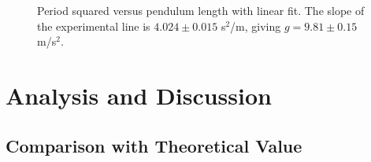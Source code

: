 \documentclass[11pt,a4paper]{article}
\begin{document}
\begin{figure}[htbp]
\centering


\caption{Period squared versus pendulum length with linear fit. The slope of the experimental line is $4.024 \pm 0.015$ s$^2$/m, giving $g = 9.81 \pm 0.15$ m/s$^2$.}
\label{fig:period-length}
\end{figure}

\section{Analysis and Discussion}
\label{sec:analysis}

\subsection{Comparison with Theoretical Value}
\end{document}
